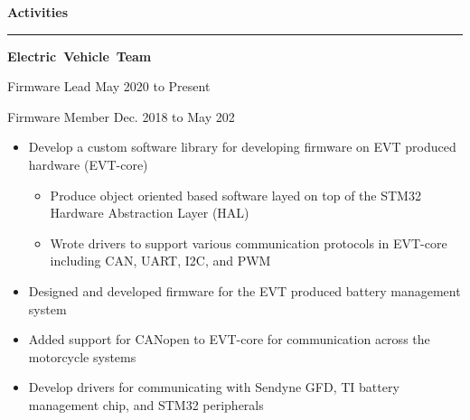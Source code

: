 \documentclass{article}
\newcommand{\rSection}[1] {
  \textcolor{header-blue} {
    \textbf{{\fontsize{0.5cm}{0.45cm}\selectfont \hbox{#1}}} \\
    \rule{0.30\textwidth}{0.1cm}
  }
}
\newcommand{\rSubSubSection}[1] {
  \textbf{{\fontsize{0.35cm}{0.45cm}\selectfont \hbox{#1}}}
}
\begin{document}
\rSection{Activities} \par

\rSubSubSection{Electric Vehicle Team}\par
Firmware Lead \hfill May 2020 to Present \par
Firmware Member \hfill Dec. 2018 to May 202
\vspace{-10pt}
\begin{itemize}
    \setlength\itemsep{0pt}
    \setlength{\parskip}{0pt}
    \item Develop a custom software library for developing firmware on EVT produced hardware (EVT-core)
    \begin{itemize}
        \setlength\itemsep{0pt}
        \setlength{\parskip}{0pt}
        \item Produce object oriented based software layed on top of the STM32 Hardware Abstraction Layer (HAL)
        \item Wrote drivers to support various communication protocols in EVT-core including CAN, UART, I2C, and PWM
    \end{itemize}
    \item Designed and developed firmware for the EVT produced battery management system
    \item Added support for CANopen to EVT-core for communication across the motorcycle systems
    \item Develop drivers for communicating with Sendyne GFD, TI battery management chip, and STM32 peripherals
\end{itemize}
\vspace{-10pt}
\end{document}
